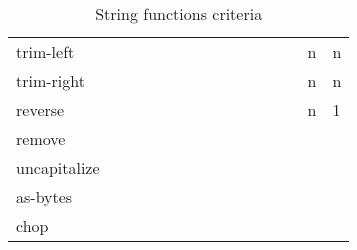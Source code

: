 \documentclass[anonymous,sigplan,review,11pt,nonacm,natbib=false]{acmart}
\begin{document}
\begin{table}
\begin{tabular}{lllllllllllllll}
            trim-left &  &  &  &  &  &  &  &  &  &  &  &  & n & n \\

            trim-right &  &  &  &  &  &  &  &  &  &  &  &  & n & n \\

            reverse &  &  &  &  &  &  &  &  &  &  &  &  & n & 1 \\

            remove &  &  &  &  &  &  &  &  &  &  &  &  &  & \\

            uncapitalize &  &  &  &  &  &  &  &  &  &  &  &  &  & \\

            as-bytes &  &  &  &  &  &  &  &  &  &  &  &  &  & \\

            chop &  &  &  &  &  &  &  &  &  &  &  &  &  & \\ \hline
        \end{tabular}
        \caption{String functions criteria}
        \label{tab:my_label}
    \end{table}

    \printbibliography
\end{document}
